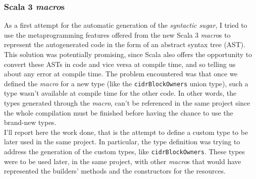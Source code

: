 \subsubsection{Scala 3 \textit{macro}s}
As a first attempt for the automatic generation of the \textit{syntactic sugar}, I tried to use the metaprogramming features offered from the new Scala 3 \textit{macro}s to represent the autogenerated code in the form of an \gls{abstract syntax tree} (AST).
This solution was potentially promising, since Scala also offers the opportunity to convert these ASTs in code and vice versa at compile time, and so telling us about any error at compile time.
The problem encountered was that once we defined the \textit{macro} for a new type (like the \texttt{cidrBlockOwners} union type), such a type wasn't available at compile time for the other code.
In other words, the types generated through the \textit{macro}, can't be referenced in the same project since the whole compilation must be finished before having the chance to use the brand-new types.\\
I'll report here the work done, that is the attempt to define a custom type to be later used in the same project.
In particular, the type definition was trying to address the generation of the custom types, like \texttt{cidrBlockOwners}. 
These types were to be used later, in the same project, with other \textit{macro}s that would have represented the builders' methods and the constructors for the resources.

